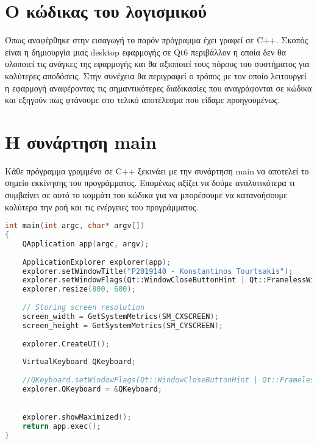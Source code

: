 






\section{Ο κώδικας του λογισμικού}

Όπως αναφέρθηκε στην εισαγωγή το παρόν πρόγραμμα έχει γραφεί σε C++. Σκοπός
είναι η δημιουργία μιας desktop εφαρμογής σε Qt6 περιβάλλον η οποία δεν
θα υλοποιεί τις ανάγκες της εφαρμογής και θα αξιοποιεί τους πόρους του
συστήματος για καλύτερες αποδόσεις. Στην συνέχεια θα περιγραφεί ο τρόπος
με τον οποίο λειτουργεί η εφαρμογή αναφέροντας τις σημαντικότερες διαδικασίες
που αναγράφονται σε κώδικα και εξηγούν πως φτάνουμε στο τελικό αποτέλεσμα
που είδαμε προηγουμένως.


\section{Η συνάρτηση main}
Κάθε πρόγραμμα γραμμένο σε C++ ξεκινάει με την συνάρτηση main να αποτελεί το
σημείο εκκίνησης του προγράμματος. Επομένως αξίζει να δούμε αναλυτικότερα τι
συμβαίνει σε αυτό το κομμάτι του κώδικα για να μπορέσουμε να κατανοήσουμε
καλύτερα την ροή και τις ενέργειες του προγράμματος.

\begin{lstlisting}[language=C++, style=cppstyle]
int main(int argc, char* argv[]) 
{
    QApplication app(argc, argv);
    
    ApplicationExplorer explorer(app);
    explorer.setWindowTitle("P2019140 - Konstantinos Tourtsakis");
    explorer.setWindowFlags(Qt::WindowCloseButtonHint | Qt::FramelessWindowHint);
    explorer.resize(800, 600);
    
    // Storing screen resolution
    screen_width = GetSystemMetrics(SM_CXSCREEN);
    screen_height = GetSystemMetrics(SM_CYSCREEN);
    
    explorer.CreateUI();
    
    VirtualKeyboard QKeyboard;
    
    //QKeyboard.setWindowFlags(Qt::WindowCloseButtonHint | Qt::FramelessWindowHint);
    explorer.QKeyboard = &QKeyboard;
    

    explorer.showMaximized();
    return app.exec();
}
\end{lstlisting}

